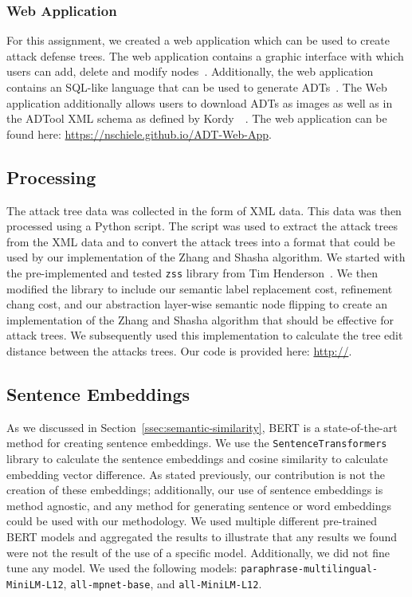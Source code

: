 \subsubsection{Web Application}

For this assignment, we created a web application which can be used to create attack defense trees. The web application contains a graphic interface with which users can add, delete and modify nodes~\cite{mohalaiaImplementingUserInterface2023}. Additionally, the web application contains an SQL-like language that can be used to generate ADTs~\cite{mezaADTLangDeclarativeLanguage2023}. The Web application additionally allows users to download ADTs as images as well as in the ADTool XML schema as defined by Kordy~\etal~\cite{kordy_adtool_2013}. The web application can be found here: \url{https://nschiele.github.io/ADT-Web-App}.

\subsection{Processing}

The attack tree data was collected in the form of XML data. This data was then processed using a Python script. The script was used to extract the attack trees from the XML data and to convert the attack trees into a format that could be used by our implementation of the Zhang and Shasha algorithm. We started with the pre-implemented and tested \texttt{zss} library from Tim Henderson~\cite{hendersonZssTreeEdit}. We then modified the library to include our semantic label replacement cost, refinement chang cost, and our abstraction layer-wise semantic node flipping to create an implementation of the Zhang and Shasha algorithm that should be effective for attack trees. We subsequently used this implementation to calculate the tree edit distance between the attacks trees. Our code is provided here: \url{http://}.


\subsection{Sentence Embeddings}
\label{ssec:method-embeddings}

As we discussed in Section~\ref{ssec:semantic-similarity}, BERT is a state-of-the-art method for creating sentence embeddings. We use the \texttt{SentenceTransformers} library to calculate the sentence embeddings and cosine similarity to calculate embedding vector difference. As stated previously, our contribution is not the creation of these embeddings; additionally, our use of sentence embeddings is method agnostic, and any method for generating sentence or word embeddings could be used with our methodology. We used multiple different pre-trained BERT models and aggregated the results to illustrate that any results we found were not the result of the use of a specific model. Additionally, we did not fine tune any model. We used the following models: \texttt{paraphrase-multilingual-MiniLM-L12}, \texttt{all-mpnet-base}, and \texttt{all-MiniLM-L12}.

